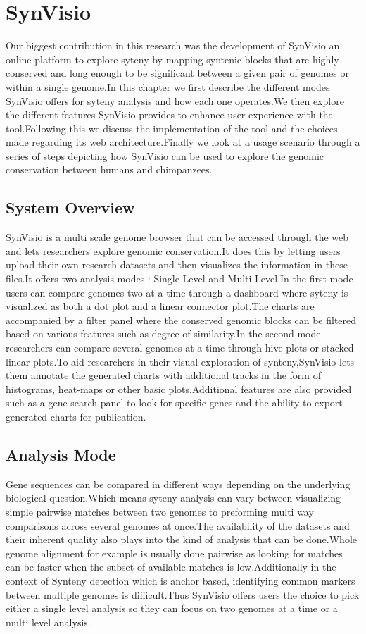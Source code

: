 \chapter{SynVisio}

Our biggest contribution in this research was the development of SynVisio an online platform to explore syteny by mapping syntenic blocks that are highly conserved and long enough to be significant between a given pair of genomes or within a single genome.In this chapter we first describe the different modes SynVisio offers for syteny analysis and how each one operates.We then explore the different features SynVisio provides to enhance user experience with the tool.Following this we discuss the implementation of the tool and the choices made regarding its web architecture.Finally we look at a usage scenario through a series of steps depicting how SynVisio can be used to explore the genomic conservation between humans and chimpanzees.

\section{System Overview}
SynVisio is a multi scale genome browser that can be accessed through the web and lets researchers explore genomic conservation.It does this by letting users upload their own research datasets and then visualizes the information in these files.It offers two analysis modes : Single Level and Multi Level.In the first mode users can compare genomes two at a time through a dashboard where syteny is visualized as both a dot plot and a linear connector plot.The charts are accompanied by a filter panel where the conserved genomic blocks can be filtered based on various features such as degree of similarity.In the second mode researchers can compare several genomes at a time through hive plots or stacked linear plots.To aid researchers in their visual exploration of synteny,SynVisio lets them annotate the generated charts with additional tracks in the form of histograms, heat-maps or other basic plots.Additional features are also provided such as a gene search panel to look for specific genes and the ability to export generated charts for publication.

\section{Analysis Mode}
Gene sequences can be compared in different ways depending on the underlying biological question.Which means syteny analysis can vary between visualizing simple pairwise matches between two genomes to preforming multi way comparisons across several genomes at once.The availability of the datasets and their inherent quality also plays into the kind of analysis that can be done.Whole genome alignment for example is usually done pairwise as looking for matches can be faster when the subset of available matches is low.Additionally in the context of Synteny detection which is anchor based, identifying common markers between multiple genomes is difficult.Thus SynVisio offers users the choice to pick either a single level analysis so they can focus on two genomes at a time or a multi level analysis.

